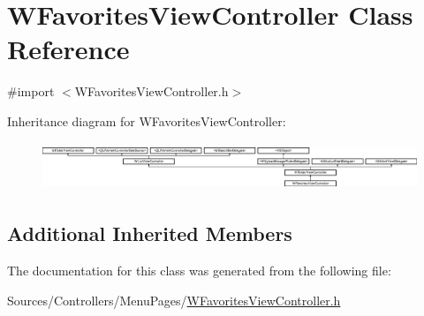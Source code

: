 \hypertarget{interface_w_favorites_view_controller}{\section{W\-Favorites\-View\-Controller Class Reference}
\label{interface_w_favorites_view_controller}
}


{\ttfamily \#import $<$W\-Favorites\-View\-Controller.\-h$>$}

Inheritance diagram for W\-Favorites\-View\-Controller\-:\begin{figure}[H]
\begin{center}
\leavevmode
\includegraphics[height=1.447964cm]{interface_w_favorites_view_controller}
\end{center}
\end{figure}
\subsection*{Additional Inherited Members}


The documentation for this class was generated from the following file\-:\begin{DoxyCompactItemize}
\item 
Sources/\-Controllers/\-Menu\-Pages/\hyperlink{_w_favorites_view_controller_8h}{W\-Favorites\-View\-Controller.\-h}\end{DoxyCompactItemize}
